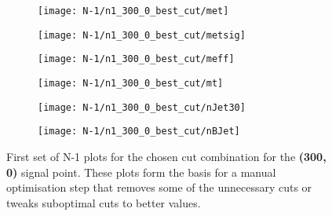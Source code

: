 \begin{figure}
	\centering
	\begin{subfigure}[b]{0.5\linewidth}
		\centering\texttt{[image: N-1/n1\_300\_0\_best\_cut/met]}
		\caption{\label{fig:result_300_0_met}}
	\end{subfigure}%
	\begin{subfigure}[b]{0.5\linewidth}
		\centering\texttt{[image: N-1/n1\_300\_0\_best\_cut/metsig]}
		\caption{\label{fig:result_300_0_metsig}}
	\end{subfigure}
	\begin{subfigure}[b]{0.5\linewidth}
		\centering\texttt{[image: N-1/n1\_300\_0\_best\_cut/meff]}
		\caption{\label{fig:result_300_0_meff}}
	\end{subfigure}%
	\begin{subfigure}[b]{0.5\linewidth}
		\centering\texttt{[image: N-1/n1\_300\_0\_best\_cut/mt]}
		\caption{\label{fig:result_300_0_mt}}
	\end{subfigure}
	\begin{subfigure}[b]{0.5\linewidth}
		\centering\texttt{[image: N-1/n1\_300\_0\_best\_cut/nJet30]}
		\caption{\label{fig:result_300_0_njet}}
	\end{subfigure}%
	\begin{subfigure}[b]{0.5\linewidth}
		\centering\texttt{[image: N-1/n1\_300\_0\_best\_cut/nBJet]}
		\caption{\label{fig:result_300_0_nbjet}}
	\end{subfigure}
	\caption[N-1 plots for the chosen cut combination for the (300,0) signal point, 1/2]{First set of N-1 plots for the chosen cut combination for the \textbf{(300, 0)} signal point. These plots form the basis for a manual optimisation step that removes some of the unnecessary cuts or tweaks suboptimal cuts to better values.}
	\label{fig:results_300_0_n-1_1}
\end{figure}

